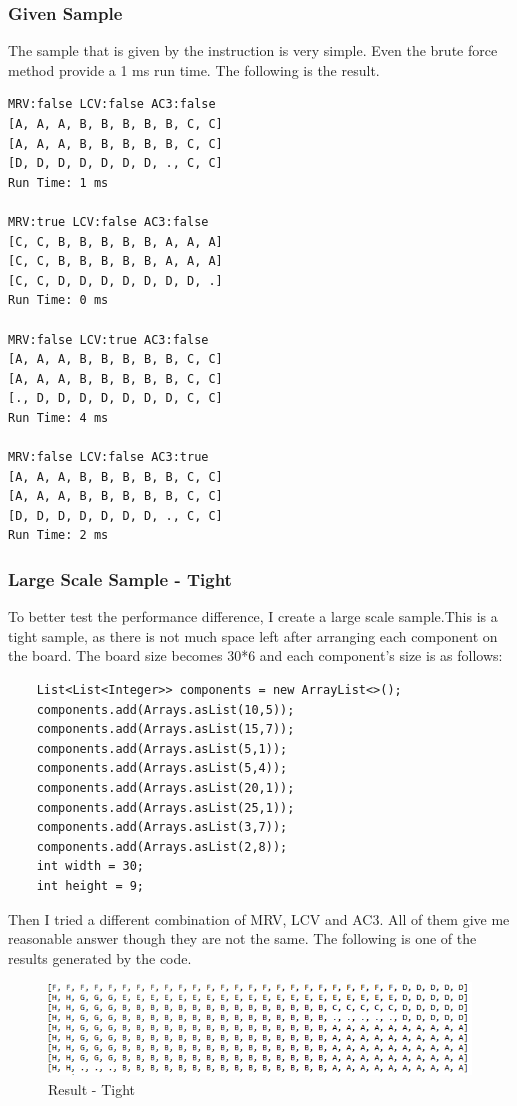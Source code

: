 \documentclass{article}
\begin{document}
\subsubsection{Given Sample}
The sample that is given by the instruction is very simple. Even the brute force method provide a 1 ms run time. The following is the result.
\begin{lstlisting}
MRV:false LCV:false AC3:false
[A, A, A, B, B, B, B, B, C, C]
[A, A, A, B, B, B, B, B, C, C]
[D, D, D, D, D, D, D, ., C, C]
Run Time: 1 ms

MRV:true LCV:false AC3:false
[C, C, B, B, B, B, B, A, A, A]
[C, C, B, B, B, B, B, A, A, A]
[C, C, D, D, D, D, D, D, D, .]
Run Time: 0 ms

MRV:false LCV:true AC3:false
[A, A, A, B, B, B, B, B, C, C]
[A, A, A, B, B, B, B, B, C, C]
[., D, D, D, D, D, D, D, C, C]
Run Time: 4 ms

MRV:false LCV:false AC3:true
[A, A, A, B, B, B, B, B, C, C]
[A, A, A, B, B, B, B, B, C, C]
[D, D, D, D, D, D, D, ., C, C]
Run Time: 2 ms
\end{lstlisting}

\subsubsection{Large Scale Sample - Tight}
To better test the performance difference, I create a large scale sample.This is a tight sample, as there is not much space left after arranging each component on the board. The board size becomes 30*6 and each component's size is as follows:
\begin{lstlisting}
	List<List<Integer>> components = new ArrayList<>();
	components.add(Arrays.asList(10,5));
	components.add(Arrays.asList(15,7));
	components.add(Arrays.asList(5,1));
	components.add(Arrays.asList(5,4));
	components.add(Arrays.asList(20,1));
	components.add(Arrays.asList(25,1));
	components.add(Arrays.asList(3,7));
	components.add(Arrays.asList(2,8));
	int width = 30;
	int height = 9;
\end{lstlisting}

Then I tried a different combination of MRV, LCV and AC3. All of them give me reasonable answer though they are not the same. The following is one of the results generated by the code.
 
\begin{figure}[H]
\centering
\includegraphics[width=\linewidth]{TightResult}
\caption{Result - Tight}
\end{figure}
\end{document}

